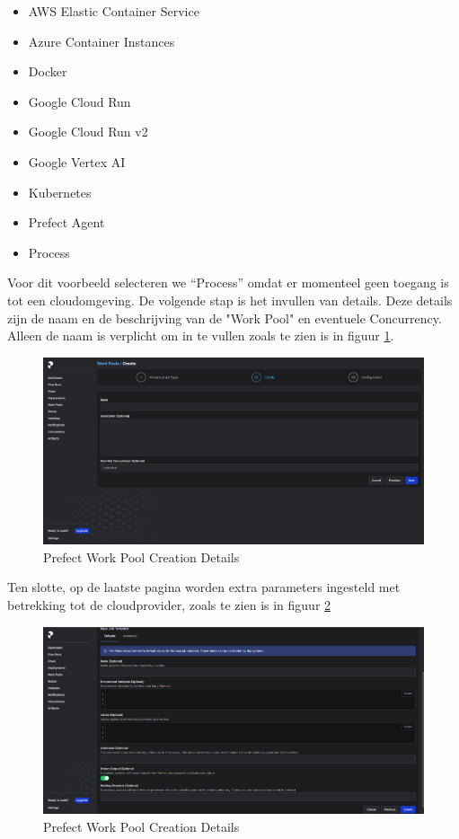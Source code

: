 \begin{itemize}
    \item AWS Elastic Container Service
    \item Azure Container Instances
    \item Docker
    \item Google Cloud Run
    \item Google Cloud Run v2
    \item Google Vertex AI
    \item Kubernetes
    \item Prefect Agent 
    \item Process
\end{itemize}
Voor dit voorbeeld selecteren we ``Process'' omdat er momenteel geen toegang is tot een cloudomgeving. De volgende stap is het invullen van details. Deze details zijn de naam en de beschrijving van de "Work Pool" en eventuele Concurrency. Alleen de naam is verplicht om in te vullen zoals te zien is in figuur \ref{fig:Prefect_Work_Pools_Create_Details}.
\begin{figure}[htbp]
    \includegraphics[width=\linewidth]{graphics/Prefect_Work_Pools_Create_Details.PNG}
    \caption{Prefect Work Pool Creation Details}
    \label{fig:Prefect_Work_Pools_Create_Details}
\end{figure}
Ten slotte, op de laatste pagina worden extra parameters ingesteld met betrekking tot de cloudprovider, zoals te zien is in figuur \ref{fig:Prefect_Work_Pools_Create_parameters}
\begin{figure}[htbp]
    \includegraphics[width=\linewidth]{graphics/Prefect_Work_Pools_Create_Parameters.PNG}
    \caption{Prefect Work Pool Creation Details}
    \label{fig:Prefect_Work_Pools_Create_parameters}
\end{figure}
